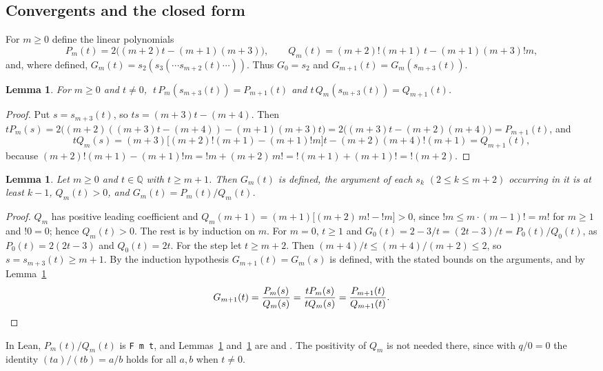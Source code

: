 \documentclass[11pt]{amsart}
\theoremstyle{plain}
\newtheorem{lemma}[theorem]{Lemma}
\theoremstyle{definition}
\newcommand{\Q}{\mathbb{Q}}
\newcommand{\lf}{\mathop{!}}
\begin{document}
\subsection{Convergents and the closed form}
For $m\ge0$ define the linear polynomials
\[
  P_m(t)=2\bigl((m+2)t-(m+1)(m+3)\bigr),\qquad Q_m(t)=(m+2)\lf(m+1)\,t-(m+1)(m+3)\lf m,
\]
and, where defined, $G_m(t)=s_2(s_3(\cdots s_{m+2}(t)\cdots))$. Thus $G_0=s_2$ and $G_{m+1}(t)=G_m(s_{m+3}(t))$.

\begin{lemma}\label{lem:step}
For $m\ge0$ and $t\ne0$, $\;t\,P_m(s_{m+3}(t))=P_{m+1}(t)$ and $t\,Q_m(s_{m+3}(t))=Q_{m+1}(t)$.
\end{lemma}

\begin{proof}
Put $s=s_{m+3}(t)$, so $ts=(m+3)t-(m+4)$. Then
$tP_m(s)=2\bigl((m+2)((m+3)t-(m+4))-(m+1)(m+3)t\bigr)=2\bigl((m+3)t-(m+2)(m+4)\bigr)=P_{m+1}(t)$, and
\[
  tQ_m(s)=(m+3)\bigl[(m+2)\lf(m+1)-(m+1)\lf m\bigr]t-(m+2)(m+4)\lf(m+1)=Q_{m+1}(t),
\]
because $(m+2)\lf(m+1)-(m+1)\lf m=\lf m+(m+2)\,m!=\lf(m+1)+(m+1)!=\lf(m+2)$.
\end{proof}

\begin{lemma}\label{lem:conv}
Let $m\ge0$ and $t\in\Q$ with $t\ge m+1$. Then $G_m(t)$ is defined, the argument of each $s_k$ $(2\le k\le m+2)$ occurring in it is at least $k-1$, $Q_m(t)>0$, and $G_m(t)=P_m(t)/Q_m(t)$.
\end{lemma}

\begin{proof}
$Q_m$ has positive leading coefficient and $Q_m(m+1)=(m+1)\bigl[(m+2)\,m!-\lf m\bigr]>0$, since $\lf m\le m\cdot(m-1)!=m!$ for $m\ge1$ and $\lf0=0$; hence $Q_m(t)>0$.
The rest is by induction on $m$. For $m=0$, $t\ge1$ and $G_0(t)=2-3/t=(2t-3)/t=P_0(t)/Q_0(t)$, as $P_0(t)=2(2t-3)$ and $Q_0(t)=2t$.
For the step let $t\ge m+2$. Then $(m+4)/t\le(m+4)/(m+2)\le2$, so $s=s_{m+3}(t)\ge m+1$. By the induction hypothesis $G_{m+1}(t)=G_m(s)$ is defined, with the stated bounds on the arguments, and by Lemma~\ref{lem:step}
\[
  G_{m+1}(t)=\frac{P_m(s)}{Q_m(s)}=\frac{tP_m(s)}{tQ_m(s)}=\frac{P_{m+1}(t)}{Q_{m+1}(t)}.\qedhere
\]
\end{proof}

In Lean, $P_m(t)/Q_m(t)$ is \texttt{F m t}, and Lemmas~\ref{lem:step} and~\ref{lem:conv} are  and . The positivity of $Q_m$ is not needed there, since with $q/0=0$ the identity $(ta)/(tb)=a/b$ holds for all $a,b$ when $t\ne0$.
\end{document}

